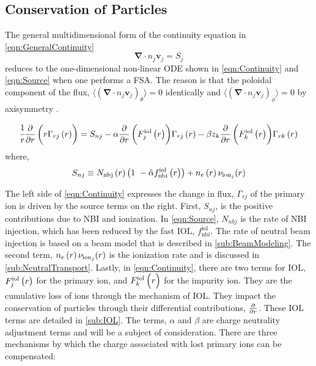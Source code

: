\subsection{Conservation of Particles} \label{sub:ParticleConservation}

The general multidimensional form of the continuity equation in \cref{eqn:GeneralContinuity}
%
\begin{equation}
	\symbf{\nabla} \cdot n_j \symbf{v}_j = S_j
	\label{eqn:GeneralContinuity}
\end{equation}
%
reduces to the one-dimensional non-linear \ac{ODE} shown in \cref{eqn:Continuity} and \cref{eqn:Source} when one performs a \ac{FSA}. The reason is that the poloidal component of the flux, $\langle \left(\symbf{\nabla} \cdot n_j \symbf{v}_j \right)_\theta \rangle = 0$ identically and $\langle \left(\symbf{\nabla} \cdot n_j \symbf{v}_j \right)_\phi \rangle = 0$ by axisymmetry \cite{Stacey2004}.

\begin{equation}
	\cfrac{1}{r} \diffpfunc{ r \func{\Gamma_{rj}}{r}}{r} =
	S_{nj} -\alpha \diffpfunc{ \FrIOL{j} }{r} \flux{j}
	-\beta z_{k} \diffpfunc{ \FrIOL{k} }{r} \flux{k}
	\label{eqn:Continuity}
\end{equation}
%
where,
%
\begin{equation}
	S_{nj} \equiv \func{N_\mathrm{nbj}}{r} \left( 1\ -\hat{\alpha } \func{f^\mathrm{iol}_\mathrm{nbi}}{r} \right)+ \func{n_{e}}{r} \nu _{\mathrm{ion}_j} (r)
	\label{eqn:Source}
\end{equation}

The left side of \cref{eqn:Continuity} expresses the change in flux, $\Gamma_{rj}$ of the primary ion is driven by the source terms on the right. First, $S_{nj}$, is the positive contributions due to \ac{NBI} and ionization. In \cref{eqn:Source}, $N_{nbj}$ is the rate of \ac{NBI} injection, which has been reduced by the fast \ac{IOL}, $f^\mathrm{iol}_\mathrm{nbi}$. The rate of neutral beam injection is based on a beam model that is described in \cref{sub:BeamModeling}. The second term, $\func{n_{e}}{r} \nu _{\mathrm{ion}_j} (r)$ is the ionization rate and is discussed in \cref{sub:NeutralTransport}. Lastly, in \cref{eqn:Continuity}, there are two terms for \ac{IOL}, $\FrIOL{j}$ for the primary ion, and $\FrIOL{k}$ for the impurity ion. They are the cumulative loss of ions through the mechanism of \ac{IOL}. They impact the conservation of particles through their differential contributions, $\diffp{}{r}$. These \ac{IOL} terms are detailed in \cref{sub:IOL}. The terms, $\alpha$ and $\beta$ are charge neutrality adjustment terms and will be a subject of consideration. There are three mechanisms by which the charge associated with lost primary ions can be compensated:

